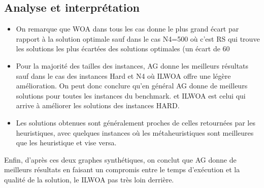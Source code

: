 \documentclass[12pt]{article}
\begin{document}
        \subsection{Analyse et interprétation}
            \begin{itemize}
                \item On remarque que WOA dans tous les cas donne le plus grand écart par rapport à la solution optimale sauf dans le cas N4=500 où c’est RS qui trouve les solutions les plus écartées des solutions optimales (un écart de 60%
                \item Pour la majorité des tailles des instances, AG donne les meilleurs résultats sauf dans le cas des instances Hard et N4 où ILWOA offre une légère amélioration. On peut donc conclure qu'en général AG donne de meilleurs solutions pour toutes les instances du benchmark. et ILWOA est celui qui arrive à améliorer les solutions des instances HARD. 
                \item Les solutions obtenues sont généralement proches de celles retournées par les heuristiques, avec quelques instances où les métaheuristiques sont meilleures que les heuristique et vise versa.
            \end{itemize}
            Enfin, d’après ces deux graphes synthétiques, on conclut  que AG donne de meilleurs résultats en faisant un compromis entre le temps d'exécution et la qualité de la solution, le ILWOA pas très loin derrière.
\end{document}
